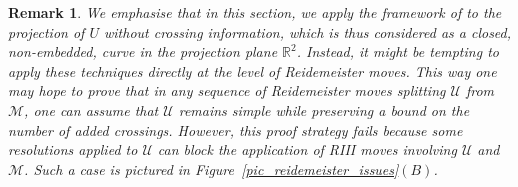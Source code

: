 \documentclass[10pt,a4paper]{amsart}
\newtheorem{remark}[theorem]{Remark}
\begin{document}
\begin{remark}
We emphasise that in this section, we apply the framework of  to the \emph{projection} of $U$ without crossing information, which is thus considered as a closed, non-embedded, curve in the projection plane $\mathbb{R}^2$. Instead, it might be tempting to apply these techniques \emph{directly at the level of Reidemeister moves}. This way one may hope to prove that in any sequence of Reidemeister moves splitting $\mathcal{U}$ from $\mathcal{M}$, one can assume that $\mathcal{U}$ remains simple while preserving a bound on the number of added crossings. However, this proof strategy fails because some resolutions applied to $\mathcal{U}$ can block the application of RIII moves involving $\mathcal{U}$ and $\mathcal{M}$. Such a case is pictured in Figure~\ref{pic_reidemeister_issues}$(B)$.
\end{remark}
\end{document}
